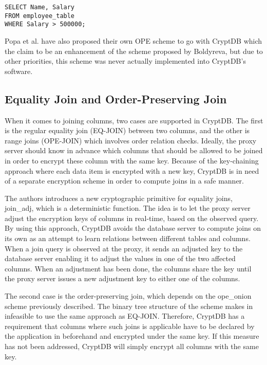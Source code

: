 \begin{verbatim}
SELECT Name, Salary
FROM employee_table
WHERE Salary > 500000;
\end{verbatim}

Popa et al. have also proposed their own OPE scheme to go with CryptDB \cite{CryptDB_OPE_Encoding} which the claim to be an enhancement of the scheme proposed by Boldyreva, but due to other priorities, this scheme was never actually implemented into CryptDB's software.



\subsection{Equality Join and Order-Preserving Join}

When it comes to joining columns, two cases are supported in CryptDB. The first is the regular equality join (EQ-JOIN) between two columns, and the other is range joins (OPE-JOIN) which involves order relation checks. Ideally, the proxy server should know in advance which columns that should be allowed to be joined in order to encrypt these column with the same key. Because of the key-chaining approach where each data item is encrypted with a new key, CryptDB is in need of a separate encryption scheme in order to compute joins in a safe manner.

The authors \citep{CryptDB_Main_Paper} introduces a new cryptographic primitive for equality joins, \gls{join_adj}, which is a deterministic function. The idea is to let the proxy server adjust the encryption keys of columns in real-time, based on the observed query. By using this approach, CryptDB avoids the database server to compute joins on its own as an attempt to learn relations between different tables and columns. When a join query is observed at the proxy, it sends an adjusted key to the database server enabling it to adjust the values in one of the two affected columns. When an adjustment has been done, the columns share the key until the proxy server issues a new adjustment key to either one of the columns.

The second case is the order-preserving join, which depends on the \gls{ope_onion} scheme previously described. The binary tree structure of the scheme makes in infeasible to use the same approach as EQ-JOIN. Therefore, CryptDB has a requirement that columns where such joins is applicable have to be declared by the application in beforehand and encrypted under the same key. If this measure has not been addressed, CryptDB will simply encrypt all columns with the same key.

